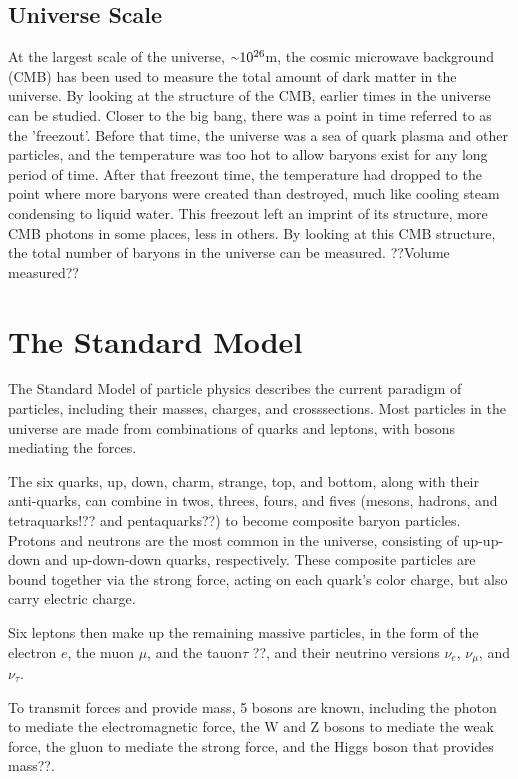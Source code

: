 \subsection{Universe Scale}
%
At the largest scale of the universe, $\nicetilde 10^{26}$m, the cosmic microwave background (CMB) has been used to measure the total amount of dark matter in the universe.
By looking at the structure of the CMB, earlier times in the universe can be studied.
Closer to the big bang, there was a point in time referred to as the 'freezout'.
Before that time, the universe was a sea of quark plasma and other particles, and the temperature was too hot to allow baryons exist for any long period of time.
After that freezout time, the temperature had dropped to the point where more baryons were created than destroyed, much like cooling steam condensing to liquid water.
This freezout left an imprint of its structure, more CMB photons in some places, less in others.
By looking at this CMB structure, the total number of baryons in the universe can be measured.
??Volume measured??


\section{The Standard Model}

The Standard Model of particle physics describes the current paradigm of particles, including their masses, charges, and crosssections.
Most particles in the universe are made from combinations of quarks and leptons, with bosons mediating the forces.

The six quarks, up, down, charm, strange, top, and bottom, along with their anti-quarks, can combine in twos, threes, fours, and fives (mesons, hadrons, and tetraquarks!?? and pentaquarks??) to become composite baryon particles.
Protons and neutrons are the most common in the universe, consisting of up-up-down and up-down-down quarks, respectively.
These composite particles are bound together via the strong force, acting on each quark's color charge, but also carry electric charge.

Six leptons then make up the remaining massive particles, in the form of the electron $e$, the muon $\mu$, and the tauon$\tau$ ??, and their neutrino versions $\nu_e$, $\nu_\mu$, and $\nu_\tau$.

To transmit forces and provide mass, 5 bosons are known, including the photon to mediate the electromagnetic force, the W and Z bosons to mediate the weak force, the gluon to mediate the strong force, and the Higgs boson that provides mass??.

